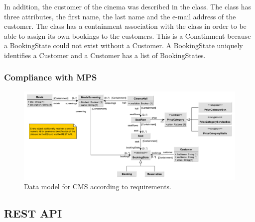 In addition, the customer of the cinema was described in the  class. The class has three attributes, the first name, the last name and the e-mail address of the customer. The  class has a containment association with the  class in order to be able to assign its own bookings to the customers. This is a Conatinment because a BookingState could not exist without a Customer. A BookingState uniquely identifies a Customer and a Customer has a list of BookingStates.

\subsubsection{Compliance with MPS}
\label{sec:cs-data-mps}



\begin{figure}[H]
    \centering
    \includegraphics[width=\textwidth]{images/data-model-final-with-price}
    \caption{Data model for CMS according to requirements.}
    \label{fig:data-model}
\end{figure}

\pagebreak

\subsection{REST API}\label{sec:cs-api}

